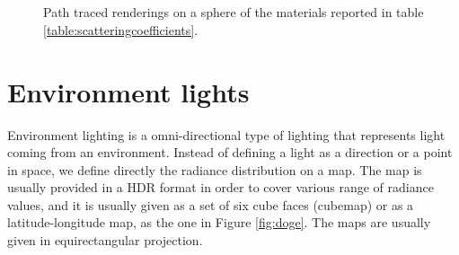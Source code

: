 \begin{figure}
{}
 \\
 \\
\caption{Path traced renderings on a sphere of the materials reported in table \ref{table:scatteringcoefficients}.}
\label{fig:examplesmaterials}
\end{figure}
\clearpage

\section{Environment lights}
\label{sec:env}
Environment lighting is a omni-directional type of lighting that represents light coming from an environment. Instead of defining a light as a direction or a point in space, we define directly the radiance distribution on a map. The map is usually provided in a HDR format in order to cover various range of radiance values, and it is usually given as a set of six cube faces (cubemap) or as a latitude-longitude map, as the one in Figure \ref{fig:doge}. The maps are usually given in equirectangular projection.


